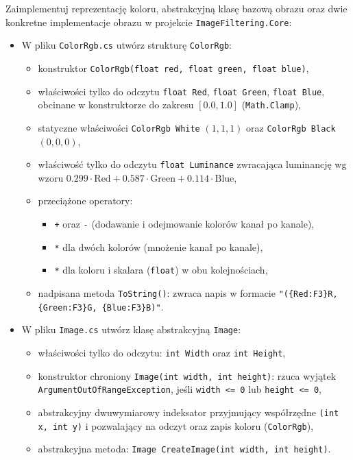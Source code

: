 \documentclass[11pt,a4paper,addpoints]{exam}
\begin{document}
\begin{questions}

\question[4]
Zaimplementuj reprezentację koloru, abstrakcyjną klasę bazową obrazu oraz dwie konkretne implementacje obrazu w projekcie \texttt{ImageFiltering.Core}:
\begin{itemize}
    \item W pliku \texttt{ColorRgb.cs} utwórz strukturę \texttt{ColorRgb}:
    \begin{itemize}
        \item konstruktor \texttt{ColorRgb(float red, float green, float blue)},
        \item właściwości tylko do odczytu \texttt{float Red}, \texttt{float Green}, \texttt{float Blue}, obcinane w konstruktorze do zakresu $[0.0, 1.0]$ (\texttt{Math.Clamp}),
        \item statyczne właściwości \texttt{ColorRgb White} $(1, 1, 1)$ oraz \texttt{ColorRgb Black} $(0, 0, 0)$,
        \item właściwość tylko do odczytu \texttt{float Luminance} zwracająca luminancję wg wzoru $0.299 \cdot \text{Red} + 0.587 \cdot \text{Green} + 0.114 \cdot \text{Blue}$,
        \item przeciążone operatory:
        \begin{itemize}
            \item \texttt{+} oraz \texttt{-} (dodawanie i odejmowanie kolorów kanał po kanale),
            \item \texttt{*} dla dwóch kolorów (mnożenie kanał po kanale),
            \item \texttt{*} dla koloru i skalara (\texttt{float}) w obu kolejnościach,
        \end{itemize}
        \item nadpisana metoda \texttt{ToString()}: zwraca napis w formacie \texttt{"(\{Red:F3\}R, \{Green:F3\}G, \{Blue:F3\}B)"}.
    \end{itemize}

    \item W pliku \texttt{Image.cs} utwórz klasę abstrakcyjną \texttt{Image}:
    \begin{itemize}
        \item właściwości tylko do odczytu: \texttt{int Width} oraz \texttt{int Height},
        \item konstruktor chroniony \texttt{Image(int width, int height)}: rzuca wyjątek \texttt{ArgumentOutOfRangeException}, jeśli \texttt{width <= 0} lub \texttt{height <= 0},
        \item abstrakcyjny dwuwymiarowy indeksator przyjmujący współrzędne \texttt{(int x, int y)} i pozwalający na odczyt oraz zapis koloru (\texttt{ColorRgb}),
        \item abstrakcyjna metoda: \texttt{Image CreateImage(int width, int height)}.
    \end{itemize}


\end{itemize}
\end{questions}
\end{document}
